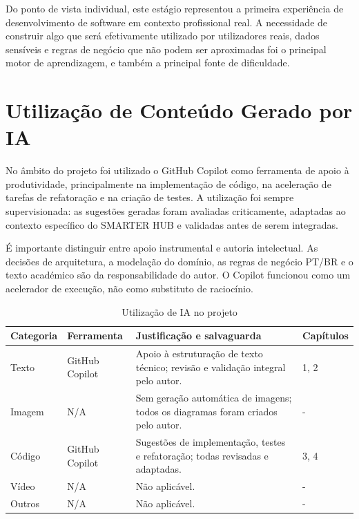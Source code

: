 \documentclass[12pt, a4paper, twoside, openright]{report}
\begin{document}
Do ponto de vista individual, este estágio representou a primeira experiência de
desenvolvimento de software em contexto profissional real. A necessidade de construir
algo que será efetivamente utilizado por utilizadores reais, dados sensíveis
e regras de negócio que não podem ser aproximadas foi o principal motor de
aprendizagem, e também a principal fonte de dificuldade.

\section{Utilização de Conteúdo Gerado por IA}

No âmbito do projeto foi utilizado o GitHub Copilot como ferramenta de apoio à
produtividade, principalmente na implementação de código, na aceleração de tarefas
de refatoração e na criação de testes. A utilização foi sempre supervisionada:
as sugestões geradas foram avaliadas criticamente, adaptadas ao contexto específico
do SMARTER HUB e validadas antes de serem integradas.

É importante distinguir entre apoio instrumental e autoria intelectual. As decisões
de arquitetura, a modelação do domínio, as regras de negócio PT/BR e o texto académico
são da responsabilidade do autor. O Copilot funcionou como um acelerador de execução,
não como substituto de raciocínio.

\begin{table}[H]
  \caption{Utilização de IA no projeto}
  \label{tab:ia}
  \small\sffamily
  \begin{tabularx}{\textwidth}{|l|l|X|l|}
    \hline
    \textbf{Categoria} & \textbf{Ferramenta} & \textbf{Justificação e salvaguarda} & \textbf{Capítulos} \\
    \hline
    Texto      & GitHub Copilot & Apoio à estruturação de texto técnico; revisão e validação integral pelo autor. & 1, 2 \\
    \hline
    Imagem     & N/A & Sem geração automática de imagens; todos os diagramas foram criados pelo autor. & - \\
    \hline
    Código     & GitHub Copilot & Sugestões de implementação, testes e refatoração; todas revisadas e adaptadas. & 3, 4 \\
    \hline
    Vídeo      & N/A & Não aplicável. & - \\
    \hline
    Outros     & N/A & Não aplicável. & - \\
    \hline
  \end{tabularx}
\end{table}
\end{document}
